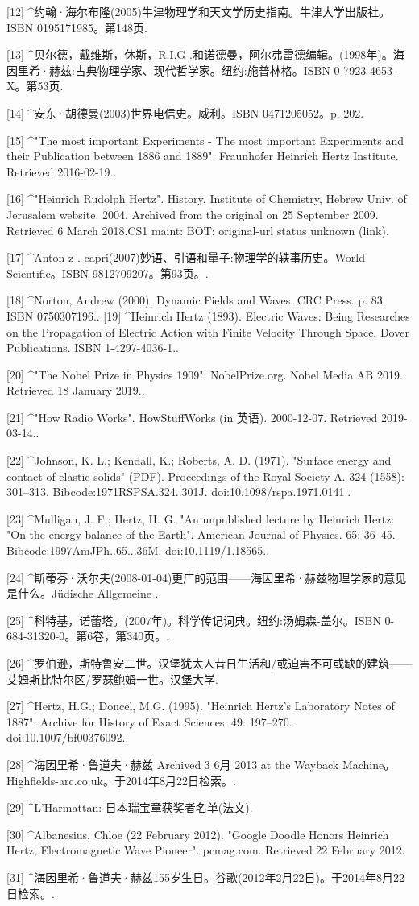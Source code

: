 [12]
^约翰·海尔布隆(2005)牛津物理学和天文学历史指南。牛津大学出版社。ISBN 0195171985。第148页.

[13]
^贝尔德，戴维斯，休斯，R.I.G .和诺德曼，阿尔弗雷德编辑。(1998年)。海因里希·赫兹:古典物理学家、现代哲学家。纽约:施普林格。ISBN 0-7923-4653-X。第53页.

[14]
^安东·胡德曼(2003)世界电信史。威利。ISBN 0471205052。p. 202.

[15]
^"The most important Experiments - The most important Experiments and their Publication between 1886 and 1889". Fraunhofer Heinrich Hertz Institute. Retrieved 2016-02-19..

[16]
^"Heinrich Rudolph Hertz". History. Institute of Chemistry, Hebrew Univ. of Jerusalem website. 2004. Archived from the original on 25 September 2009. Retrieved 6 March 2018.CS1 maint: BOT: original-url status unknown (link).

[17]
^Anton z . capri(2007)妙语、引语和量子:物理学的轶事历史。World Scientific。ISBN 9812709207。第93页。.

[18]
^Norton, Andrew (2000). Dynamic Fields and Waves. CRC Press. p. 83. ISBN 0750307196..
[19]
^Heinrich Hertz (1893). Electric Waves: Being Researches on the Propagation of Electric Action with Finite Velocity Through Space. Dover Publications. ISBN 1-4297-4036-1..

[20]
^"The Nobel Prize in Physics 1909". NobelPrize.org. Nobel Media AB 2019. Retrieved 18 January 2019..

[21]
^"How Radio Works". HowStuffWorks (in 英语). 2000-12-07. Retrieved 2019-03-14..

[22]
^Johnson, K. L.; Kendall, K.; Roberts, A. D. (1971). "Surface energy and contact of elastic solids" (PDF). Proceedings of the Royal Society A. 324 (1558): 301–313. Bibcode:1971RSPSA.324..301J. doi:10.1098/rspa.1971.0141..

[23]
^Mulligan, J. F.; Hertz, H. G. "An unpublished lecture by Heinrich Hertz: "On the energy balance of the Earth". American Journal of Physics. 65: 36–45. Bibcode:1997AmJPh..65...36M. doi:10.1119/1.18565..

[24]
^斯蒂芬·沃尔夫(2008-01-04)更广的范围——海因里希·赫兹物理学家的意见是什么。Jüdische Allgemeine ..

[25]
^科特基，诺蕾塔。(2007年)。科学传记词典。纽约:汤姆森-盖尔。ISBN 0-684-31320-0。第6卷，第340页。.

[26]
^罗伯逊，斯特鲁安二世。汉堡犹太人昔日生活和/或迫害不可或缺的建筑——艾姆斯比特尔区/罗瑟鲍姆一世。汉堡大学.

[27]
^Hertz, H.G.; Doncel, M.G. (1995). "Heinrich Hertz's Laboratory Notes of 1887". Archive for History of Exact Sciences. 49: 197–270. doi:10.1007/bf00376092..

[28]
^海因里希·鲁道夫·赫兹 Archived 3 6月 2013 at the Wayback Machine。Highfields-arc.co.uk。于2014年8月22日检索。.

[29]
^L'Harmattan: 日本瑞宝章获奖者名单(法文).

[30]
^Albanesius, Chloe (22 February 2012). "Google Doodle Honors Heinrich Hertz, Electromagnetic Wave Pioneer". pcmag.com. Retrieved 22 February 2012.

[31]
^海因里希·鲁道夫·赫兹155岁生日。谷歌(2012年2月22日)。于2014年8月22日检索。.